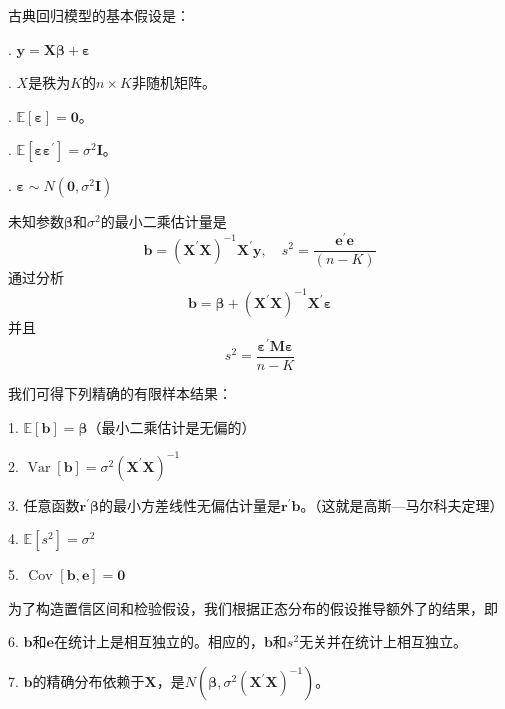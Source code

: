 古典回归模型的基本假设是：

\uppercase\expandafter{}. $ \boldsymbol{y} = \boldsymbol{X\beta}+\boldsymbol{\varepsilon} $

\uppercase\expandafter{}. $ X $是秩为$ K $的$ n \times K $非随机矩阵。

\uppercase\expandafter{}. $ \mathbb{E}\left [ \boldsymbol{\varepsilon} \right ] = \boldsymbol{0} $。

\uppercase\expandafter{}. $ \mathbb{E}\left[\boldsymbol{\varepsilon} \boldsymbol{\varepsilon}^{\prime}\right]=\sigma^{2}\boldsymbol{I} $。

\uppercase\expandafter{}. $ \boldsymbol{\varepsilon} \sim N\left(\boldsymbol{0}, \sigma^{2} \boldsymbol{I}\right) $

未知参数$ \boldsymbol{\beta} $和$ \sigma^{2} $的最小二乘估计量是
$$ \boldsymbol{b}=\left(\boldsymbol{X}^{\prime} \boldsymbol{X}\right)^{-1} \boldsymbol{X}^{\prime} \boldsymbol{y},\quad s^{2}=\frac{\boldsymbol{e}^{\prime} \boldsymbol{e}}{(n-K)} $$
通过分析
$$ \boldsymbol{b}=\boldsymbol{\beta}+\left(\boldsymbol{X}^{\prime} \boldsymbol{X}\right)^{-1} \boldsymbol{X}^{\prime} \boldsymbol{\varepsilon} $$
并且
$$ s^{2}=\frac{\boldsymbol{\varepsilon}^{\prime} \boldsymbol{M} \boldsymbol{\varepsilon}}{n-K} $$

我们可得下列精确的有限样本结果：

1. $ \mathbb{E}\left [ \boldsymbol{b} \right ] = \boldsymbol{\beta} $（最小二乘估计是无偏的）
	
2. $ \operatorname{Var}[\boldsymbol{b}]=\sigma^{2}\left(\boldsymbol{X}^{\prime} \boldsymbol{X}\right)^{-1} $
	
3. 任意函数$ \boldsymbol{r}^{\prime} \boldsymbol{\beta} $的最小方差线性无偏估计量是$ \boldsymbol{r}^{\prime} \boldsymbol{b} $。（这就是高斯—马尔科夫定理）	
	
4. $ \mathbb{E}\left[s^{2}\right]=\sigma^{2} $

5. $ \text { Cov }[\boldsymbol{b},\boldsymbol{e}] = \boldsymbol{0} $

为了构造置信区间和检验假设，我们根据正态分布的假设\uppercase\expandafter{}推导额外了的结果，即

6. $ \boldsymbol{b} $和$ \boldsymbol{e} $在统计上是相互独立的。相应的，$ \boldsymbol{b} $和$ s^{2} $无关并在统计上相互独立。

7. $ \boldsymbol{b} $的精确分布依赖于$ \boldsymbol{X} $，是$ N\left(\boldsymbol{\beta}, \sigma^{2}\left(\boldsymbol{X}^{\prime} \boldsymbol{X}\right)^{-1}\right) $。

